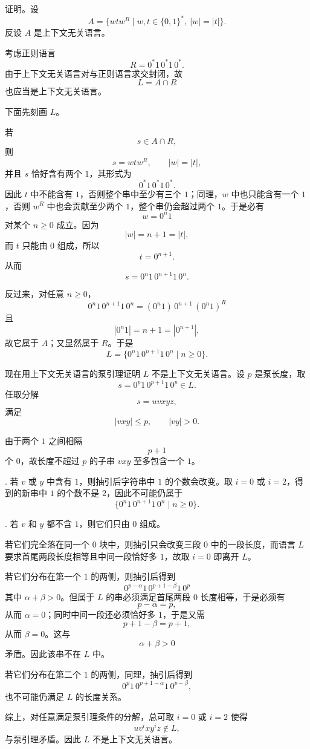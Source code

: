\begin{answerred}
证明。设
\[
    A=\{wtw^R\mid w,t\in\{0,1\}^*,\ |w|=|t|\}.
\]
反设 $A$ 是上下文无关语言。

考虑正则语言
\[
    R=0^*1\,0^*1\,0^*.
\]
由于上下文无关语言对与正则语言求交封闭，故
\[
    L=A\cap R
\]
也应当是上下文无关语言。

下面先刻画 $L$。

若
\[
    s\in A\cap R,
\]
则
\[
    s=wtw^R,\qquad |w|=|t|,
\]
并且 $s$ 恰好含有两个 $1$，其形式为
\[
    0^*1\,0^*1\,0^*.
\]
因此 $t$ 中不能含有 $1$，否则整个串中至少有三个 $1$；同理，$w$ 中也只能含有一个 $1$，否则 $w^R$ 中也会贡献至少两个 $1$，整个串仍会超过两个 $1$。于是必有
\[
    w=0^n1
\]
对某个 $n\ge 0$ 成立。因为
\[
    |w|=n+1=|t|,
\]
而 $t$ 只能由 $0$ 组成，所以
\[
    t=0^{n+1}.
\]
从而
\[
    s=0^n1\,0^{n+1}1\,0^n.
\]

反过来，对任意 $n\ge 0$，
\[
    0^n1\,0^{n+1}1\,0^n
    =(0^n1)\,0^{n+1}\,(0^n1)^R
\]
且
\[
    |0^n1|=n+1=|0^{n+1}|,
\]
故它属于 $A$；又显然属于 $R$。于是
\[
    L=\{0^n1\,0^{n+1}1\,0^n\mid n\ge 0\}.
\]

现在用上下文无关语言的泵引理证明 $L$ 不是上下文无关语言。设 $p$ 是泵长度，取
\[
    s=0^p1\,0^{p+1}1\,0^p\in L.
\]
任取分解
\[
    s=uvxyz,
\]
满足
\[
    |vxy|\le p,\qquad |vy|>0.
\]

由于两个 $1$ 之间相隔
\[
    p+1
\]
个 $0$，故长度不超过 $p$ 的子串 $vxy$ 至多包含一个 $1$。

\medskip
{}. 若 $v$ 或 $y$ 中含有 $1$，则抽引后字符串中 $1$ 的个数会改变。取 $i=0$ 或 $i=2$，得到的新串中 $1$ 的个数不是 $2$，因此不可能仍属于
\[
    \{0^n1\,0^{n+1}1\,0^n\mid n\ge 0\}.
\]

\medskip
{}. 若 $v$ 和 $y$ 都不含 $1$，则它们只由 $0$ 组成。

若它们完全落在同一个 $0$ 块中，则抽引只会改变三段 $0$ 中的一段长度，而语言 $L$ 要求首尾两段长度相等且中间一段恰好多 $1$，故取 $i=0$ 即离开 $L$。

若它们分布在第一个 $1$ 的两侧，则抽引后得到
\[
    0^{p-\alpha}1\,0^{p+1-\beta}1\,0^p
\]
其中 $\alpha+\beta>0$。但属于 $L$ 的串必须满足首尾两段 $0$ 长度相等，于是必须有
\[
    p-\alpha=p,
\]
从而 $\alpha=0$；同时中间一段还必须恰好多 $1$，于是又需
\[
    p+1-\beta=p+1,
\]
从而 $\beta=0$。这与
\[
    \alpha+\beta>0
\]
矛盾。因此该串不在 $L$ 中。

若它们分布在第二个 $1$ 的两侧，同理，抽引后得到
\[
    0^p1\,0^{p+1-\alpha}1\,0^{p-\beta},
\]
也不可能仍满足 $L$ 的长度关系。

\medskip
综上，对任意满足泵引理条件的分解，总可取 $i=0$ 或 $i=2$ 使得
\[
    uv^i x y^i z\notin L,
\]
与泵引理矛盾。因此 $L$ 不是上下文无关语言。


\end{answerred}
